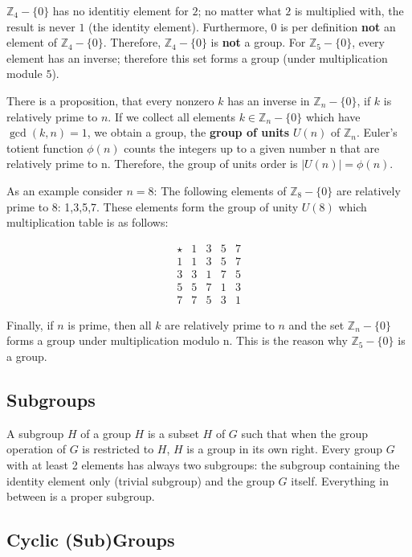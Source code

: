 \(\mathbb{Z}_4 - \{0\}\) has no identitiy element for \(2\); no matter
what \(2\) is multiplied with, the result is never \(1\) (the identity
element). Furthermore, \(0\) is per definition \textbf{not} an element
of \(\mathbb{Z}_4 - \{0\}\). Therefore, \(\mathbb{Z}_4 - \{0\}\) is
\textbf{not} a group. For \(\mathbb{Z}_5 - \{0\}\), every element has an
inverse; therefore this set forms a group (under multiplication module
\(5\)).

There is a proposition, that every nonzero \(k\) has an inverse in
\(\mathbb{Z}_n - \{0\}\), if \(k\) is relatively prime to \(n\). If we
collect all elements \(k \in \mathbb{Z}_n - \{0\}\) which have
\(\gcd(k,n)=1\), we obtain a group, the \textbf{group of units} \(U(n)\)
of \(\mathbb{Z}_n\). Euler's totient function \(\phi(n)\) counts the
integers up to a given number n that are relatively prime to n.
Therefore, the group of units order is \(|U(n)| = \phi(n)\).

As an example consider \(n=8\): The following elements of
\(\mathbb{Z}_8 - \{0\}\) are relatively prime to 8: 1,3,5,7. These
elements form the group of unity \(U(8)\) which multiplication table is
as follows:

\[
\begin{array}{c|cccc}
\star & 1 & 3 & 5 & 7 \\ \hline
1     & 1 & 3 & 5 & 7 \\
3     & 3 & 1 & 7 & 5 \\
5     & 5 & 7 & 1 & 3 \\
7     & 7 & 5 & 3 & 1
\end{array}
\]

Finally, if \(n\) is prime, then all \(k\) are relatively prime to \(n\)
and the set \(\mathbb{Z}_n - \{0\}\) forms a group under multiplication
modulo n. This is the reason why \(\mathbb{Z}_5 - \{0\}\) is a group.

\subsection{Subgroups}\label{subgroups}

A subgroup \(H\) of a group \(H\) is a subset \(H\) of \(G\) such that
when the group operation of \(G\) is restricted to \(H\), \(H\) is a
group in its own right. Every group \(G\) with at least 2 elements has
always two subgroups: the subgroup containing the identity element only
(trivial subgroup) and the group \(G\) itself. Everything in between is
a proper subgroup.

\subsection{Cyclic (Sub)Groups}\label{cyclic-subgroups}

